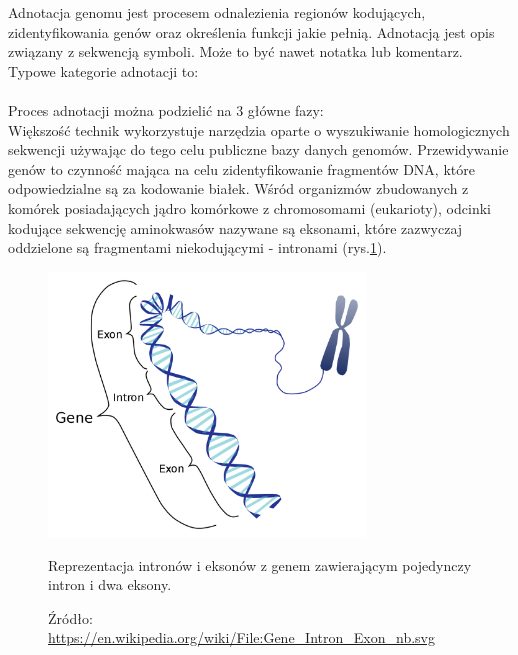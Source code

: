 Adnotacja genomu jest procesem odnalezienia regionów kodujących, zidentyfikowania genów oraz określenia funkcji jakie pełnią.
Adnotacją jest opis związany z sekwencją symboli.
Może to być nawet notatka lub komentarz.
Typowe kategorie adnotacji to:
\\
\\
Proces adnotacji można podzielić na 3 główne fazy:
\\

Większość technik wykorzystuje narzędzia oparte o wyszukiwanie homologicznych sekwencji używając do tego celu publiczne bazy danych genomów.
Przewidywanie genów to czynność mająca na celu zidentyfikowanie fragmentów DNA, które odpowiedzialne są za kodowanie białek.
Wśród organizmów zbudowanych z komórek posiadających jądro komórkowe z chromosomami (eukarioty), odcinki kodujące sekwencję aminokwasów nazywane są eksonami, które zazwyczaj oddzielone są fragmentami niekodującymi - intronami (rys.\ref{img:intron-exon}).

\begin{figure}[h]
	\centering
	\includegraphics[width=0.75\textwidth]{img/intron-exon.png}
	\caption{Reprezentacja intronów i eksonów z genem zawierającym pojedynczy intron i dwa eksony.}
	\vspace{-0.5cm}
	\caption*{\scriptsize Źródło: \url{https://en.wikipedia.org/wiki/File:Gene\_Intron\_Exon\_nb.svg}}
	\label{img:intron-exon}
\end{figure}


